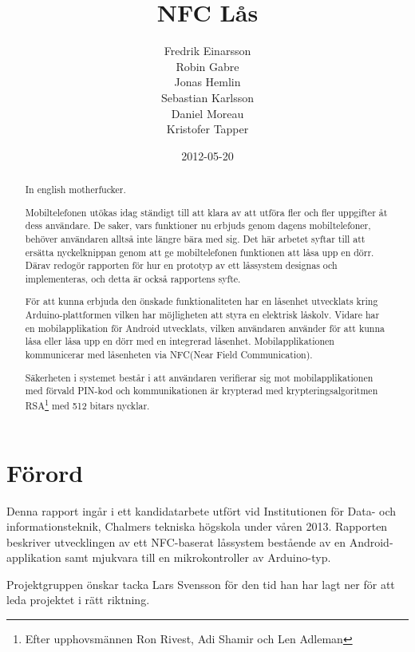 \documentclass[11pt]{article}
\begin{document}
\title{NFC Lås}

\date{2012-05-20}

\author{Fredrik Einarsson\\
    	Robin Gabre\\
		Jonas Hemlin\\
		Sebastian Karlsson\\
		Daniel Moreau\\ 
		Kristofer Tapper\\}

\maketitle
\newpage

\section*{Förord}
Denna rapport ingår i ett kandidatarbete utfört vid Institutionen för Data- och informationsteknik, Chalmers tekniska högskola under våren 2013. Rapporten beskriver utvecklingen av ett NFC-baserat låssystem bestående av en Android-applikation samt mjukvara till en mikrokontroller av Arduino-typ.

Projektgruppen önskar tacka Lars Svensson för den tid han har lagt ner för att leda projektet i rätt riktning.

\newpage

\renewcommand{\abstractname}{Abstract}
\begin{abstract}
In english motherfucker.
\end{abstract}
\newpage

\renewcommand{\abstractname}{Sammanfattning}
\begin{abstract}
Mobiltelefonen utökas idag ständigt till att klara av att utföra fler och fler uppgifter åt dess användare. De saker, vars funktioner nu erbjuds genom dagens mobiltelefoner, behöver användaren alltså inte längre bära med sig. Det här arbetet syftar till att ersätta nyckelknippan genom att ge mobiltelefonen funktionen att låsa upp en dörr. Därav redogör rapporten för hur en prototyp av ett låssystem designas och implementeras, och detta är också rapportens syfte.

För att kunna erbjuda den önskade funktionaliteten har en låsenhet utvecklats kring Arduino-plattformen vilken har möjligheten att styra en elektrisk låskolv. Vidare har en mobilapplikation för Android utvecklats, vilken användaren använder för att kunna låsa eller låsa upp en dörr med en integrerad låsenhet. Mobilapplikationen kommunicerar med låsenheten via NFC(Near Field Communication).

Säkerheten i systemet består i att användaren verifierar sig mot mobilapplikationen med förvald PIN-kod och kommunikationen är krypterad med krypteringsalgoritmen RSA\footnote{Efter upphovsmännen Ron Rivest, Adi Shamir och Len Adleman} med 512 bitars nycklar.

\end{abstract}
\newpage
\end{document}
